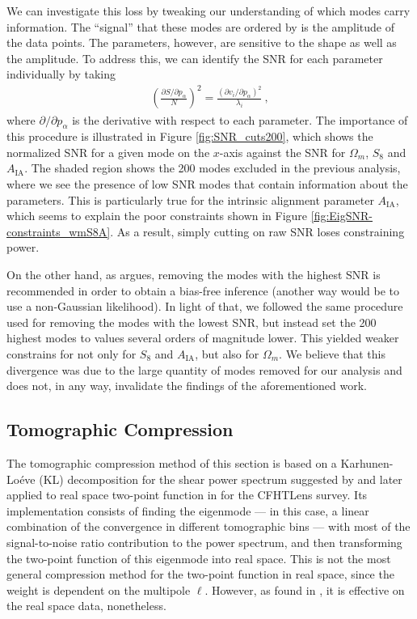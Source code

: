 \documentclass[aps, prd, twocolumn, superscriptaddress, nofootinbib, amssymb, amsmath]{revtex4-2}
\newcommand{\rf}[1]{Figure \ref{fig:#1}}
\newcommand\bea{\begin{eqnarray}}
\newcommand\eea{\end{eqnarray}}
\begin{document}
We can investigate this loss by tweaking our understanding of which modes carry information. The ``signal'' that these modes are ordered by is the amplitude of the data points.  The parameters, however, are sensitive to the shape as well as the amplitude. To address this, we can identify the SNR for each parameter individually by taking
\bea
\left(\frac{\partial S/\partial p_\alpha}{N}\right)^2 = \frac{(\partial v_i / \partial p_\alpha)^2}{\lambda_i}\
,\eea
where $\partial /\partial p_\alpha$ is the derivative with respect to each parameter. The importance of this procedure is illustrated in \rf{SNR_cuts200}, which shows the normalized SNR for a given mode on the $x$-axis against the SNR for $\Omega_m$, $S_8$ and $A_{\text{IA}}$. The shaded region shows the 200 modes excluded in the previous analysis, where we see the presence of low SNR modes that contain information about the parameters. This is particularly true for the intrinsic alignment parameter $A_{\text{IA}}$, which seems to explain the poor constraints shown in \rf{EigSNR-constraints_wmS8A}. As a result, simply cutting on raw SNR loses constraining power.

On the other hand, as \cite{Louca:2020} argues, removing the modes with the highest SNR is recommended in order to obtain a bias-free inference (another way would be to use a non-Gaussian likelihood). In light of that, we followed the same procedure used for removing the modes with the lowest SNR, but instead set the 200 highest modes to values several orders of magnitude lower. This yielded weaker constrains for not only for $S_8$ and $A_{\text{IA}}$, but also for $\Omega_m$. We believe that this divergence was due to the large quantity of modes removed for our analysis and does not, in any way, invalidate the findings of the aforementioned work.

\subsection{Tomographic Compression}
\label{subsec:tomographic_compression}

The tomographic compression method of this section is based on a Karhunen-Lo\'eve (KL) decomposition for the shear power spectrum suggested by \cite{Alonso:2017hhj} and later applied to real space two-point function in \cite{Bellini:2019ssw} for the CFHTLens survey. Its implementation consists of finding the eigenmode --- in this case, a linear combination of the convergence in different tomographic bins --- with most of the signal-to-noise ratio contribution to the power spectrum, and then transforming the two-point function of this eigenmode into real space. This is not the most general compression method for the two-point function in real space, since the weight is dependent on the multipole $\ell$. However, as found in \cite{Bellini:2019ssw}, it is effective on the real space data, nonetheless.
\end{document}
